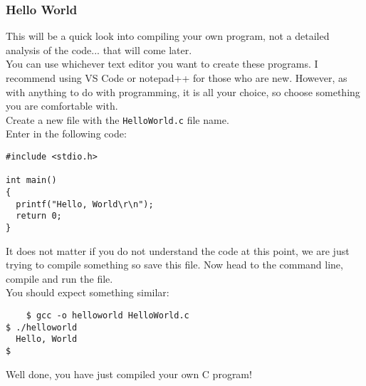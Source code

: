 \subsubsection{Hello World}
This will be a quick look into compiling your own program, not a detailed analysis of the code... that will come later.\\
You can use whichever text editor you want to create these programs. I recommend using VS Code or notepad++ for those who are new. However, as with anything to do with programming, it is all your choice, so choose something you are comfortable with. \\
Create a new file with the \texttt{HelloWorld.c} file name.\\
Enter in the following code:
\begin{file}[HelloWorld.c]
\begin{lstlisting}[style=CStyle]
#include <stdio.h>

int main()
{
  printf("Hello, World\r\n");
  return 0;
}
\end{lstlisting}
\end{file}
It does not matter if you do not understand the code at this point, we are just trying to compile something so save this file. Now head to the command line, compile and run the file.\\
You should expect something similar:
\begin{commandline}
\begin{verbatim}
	$ gcc -o helloworld HelloWorld.c
$ ./helloworld
  Hello, World
$  
\end{verbatim}
\end{commandline}
Well done, you have just compiled your own C program!
